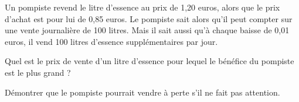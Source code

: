 
Un pompiste revend le litre d'essence au prix de 1,20 euros, alors que le prix d'achat est pour lui de 0,85 euros. Le pompiste sait alors qu'il peut compter sur une vente journalière de 100 litres. Mais il sait aussi qu'à chaque baisse de 0,01  euros, il vend 100 litres d'essence supplémentaires par jour.

Quel est le prix de vente d'un litre d'essence pour lequel le bénéfice du pompiste est le plus grand ?

Démontrer que le pompiste pourrait vendre à perte s'il ne fait pas attention.

\hfill{}

